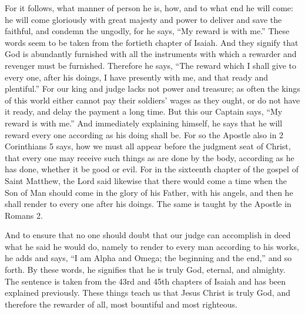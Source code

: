 For it follows, what manner of person he is, how, and to what end he will come: he will come gloriously with great majesty and power to deliver and save the faithful, and condemn the ungodly, for he says, “My reward is with me.” These words seem to be taken from the fortieth chapter of Isaiah. And they signify that God is abundantly furnished with all the instruments with which a rewarder and revenger must be furnished. Therefore he says, “The reward which I shall give to every one, after his doings, I have presently with me, and that ready and plentiful.” For our king and judge lacks not power and treasure; as often the kings of this world either cannot pay their soldiers’ wages as they ought, or do not have it ready, and delay the payment a long time. But this our Captain says, “My reward is with me.” And immediately explaining himself, he says that he will reward every one according as his doing shall be. For so the Apostle also in 2 Corinthians 5 says, how we must all appear before the judgment seat of Christ, that every one may receive such things as are done by the body, according as he has done, whether it be good or evil. For in the sixteenth chapter of the gospel of Saint Matthew, the Lord said likewise that there would come a time when the Son of Man should come in the glory of his Father, with his angels, and then he shall render to every one after his doings. The same is taught by the Apostle in Romans 2.

And to ensure that no one should doubt that our judge can accomplish in deed what he said he would do, namely to render to every man according to his works, he adds and says, “I am Alpha and Omega; the beginning and the end,” and so forth. By these words, he signifies that he is truly God, eternal, and almighty. The sentence is taken from the 43rd and 45th chapters of Isaiah and has been explained previously. These things teach us that Jesus Christ is truly God, and therefore the rewarder of all, most bountiful and most righteous.

